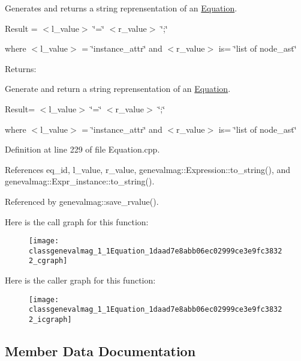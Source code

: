 Generates and returns a string reprensentation of an \hyperlink{classgenevalmag_1_1Equation}{Equation}.\par
 \par
 Result = $<$l\_\-value$>$ \char`\"{}=\char`\"{} $<$r\_\-value$>$ \char`\"{};\char`\"{}\par
 \par
 where $<$l\_\-value$>$ = \char`\"{}instance\_\-attr\char`\"{} and $<$r\_\-value$>$ is= \char`\"{}list of node\_\-ast\char`\"{}\par


\begin{Desc}
\item[Returns:]\end{Desc}
Generate and return a string reprensentation of an \hyperlink{classgenevalmag_1_1Equation}{Equation}.

Result= $<$l\_\-value$>$ \char`\"{}=\char`\"{} $<$r\_\-value$>$ \char`\"{};\char`\"{}

where $<$l\_\-value$>$ = \char`\"{}instance\_\-attr\char`\"{} and $<$r\_\-value$>$ is= \char`\"{}list of node\_\-ast\char`\"{} 

Definition at line 229 of file Equation.cpp.

References eq\_\-id, l\_\-value, r\_\-value, genevalmag::Expression::to\_\-string(), and genevalmag::Expr\_\-instance::to\_\-string().

Referenced by genevalmag::save\_\-rvalue().

Here is the call graph for this function:\nopagebreak
\begin{figure}[H]
\begin{center}
\leavevmode
\texttt{[image: classgenevalmag\_1\_1Equation\_1daad7e8abb06ec02999ce3e9fc38322\_cgraph]}
\end{center}
\end{figure}


Here is the caller graph for this function:\nopagebreak
\begin{figure}[H]
\begin{center}
\leavevmode
\texttt{[image: classgenevalmag\_1\_1Equation\_1daad7e8abb06ec02999ce3e9fc38322\_icgraph]}
\end{center}
\end{figure}


\subsection{Member Data Documentation}
\hypertarget{classgenevalmag_1_1Equation_96ea50e0ed15373e6246fd00d8c79ac4}{
\subsubsection[{count\_\-ref}]{}}
\label{classgenevalmag_1_1Equation_96ea50e0ed15373e6246fd00d8c79ac4}


